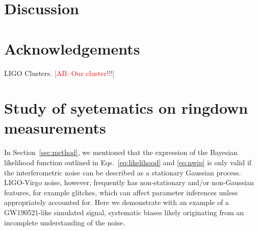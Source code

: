 \documentclass[twocolumn,prd,aps,superscriptaddress,preprintnumbers,tightenlines,showpacs,nofootinbib,eqsecnum,amsfonts,amsmath]{revtex4-1}
\newcommand{\comment}[1]{\textcolor{red}{[#1]}}
\begin{document}
\section{Discussion}\label{sec:discussion}

\section*{Acknowledgements}
\label{sec:acknowledgements}
LIGO Clusters. \comment{AB: Our cluster!!!}


\appendix

\section{Study of syetematics on ringdown measurements}\label{sec:noise_systematics}

In Section~\ref{sec:method}, we mentioned that the expression of the Bayesian likelihood function outlined in Eqs.~\ref{eq:likelihood} and \ref{eq:nwip} is only valid if the interferometric noise can be described as a stationary Gaussian process. LIGO-Virgo noise, however, frequently has non-stationary and/or non-Gaussian features, for example glitches, which can affect parameter inferences unless appropriately accounted for. Here we demonstrate with an example of a GW190521-like simulated signal, systematic biases likely originating from an incomplete understanding of the noise. 
\end{document}
